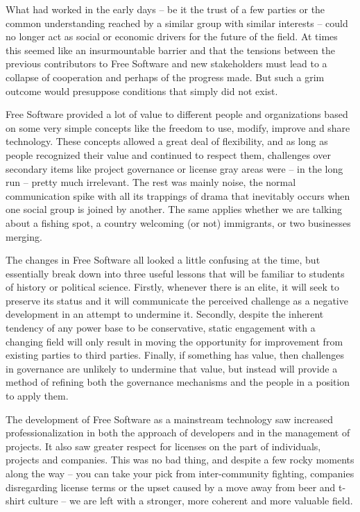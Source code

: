 What had worked in the early days -- be it the trust of a few parties or the common understanding reached by a similar group with similar interests -- could no longer act as social or economic drivers for the future of the field. At times this seemed like an insurmountable barrier and that the tensions between the previous contributors to Free Software and new stakeholders must lead to a collapse of cooperation and perhaps of the progress made. But such a grim outcome would presuppose conditions that simply did not exist.

Free Software provided a lot of value to different people and organizations based on some very simple concepts like the freedom to use, modify, improve and share technology. These concepts allowed a great deal of flexibility, and as long as people recognized their value and continued to respect them, challenges over secondary items like project governance or license gray areas were -- in the long run -- pretty much irrelevant. The rest was mainly noise, the normal communication spike with all its trappings of drama that inevitably occurs when one social group is joined by another. The same applies whether we are talking about a fishing spot, a country welcoming (or not) immigrants, or two businesses merging.

The changes in Free Software all looked a little confusing at the time, but essentially break down into three useful lessons that will be familiar to students of history or political science. Firstly, whenever there is an elite, it will seek to preserve its status and it will communicate the perceived challenge as a negative development in an attempt to undermine it. Secondly, despite the inherent tendency of any power base to be conservative, static engagement with a changing field will only result in moving the opportunity for improvement from existing parties to third parties. Finally, if something has value, then challenges in governance are unlikely to undermine that value, but instead will provide a method of refining both the governance mechanisms and the people in a position to apply them.

The development of Free Software as a mainstream technology saw increased professionalization in both the approach of developers and in the management of projects. It also saw greater respect for licenses on the part of individuals, projects and companies. This was no bad thing, and despite a few rocky moments along the way -- you can take your pick from inter-community fighting, companies disregarding license terms or the upset caused by a move away from beer and t-shirt culture -- we are left with a stronger, more coherent and more valuable field.
